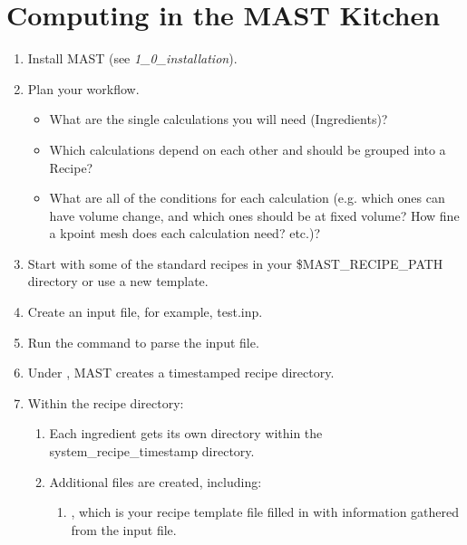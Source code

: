 \documentclass[letterpaper,10pt,english]{sphinxmanual}
\begin{document}
\section{Computing in the MAST Kitchen}
\label{0_0_introduction:computing-in-the-mast-kitchen}\begin{enumerate}
\item {} 
Install MAST (see \emph{1\_0\_installation}).

\item {} 
Plan your workflow.
\begin{itemize}
\item {} 
What are the single calculations you will need (Ingredients)?

\item {} 
Which calculations depend on each other and should be grouped into a Recipe?

\item {} 
What are all of the conditions for each calculation (e.g. which ones can have volume change, and which ones should be at fixed volume? How fine a kpoint mesh does each calculation need? etc.)?

\end{itemize}

\item {} 
Start with some of the standard recipes in your \$MAST\_RECIPE\_PATH directory or use a new template.

\item {} 
Create an input file, for example, test.inp.

\item {} 
Run the command  to parse the input file.

\item {} 
Under , MAST creates a timestamped recipe directory.

\item {} 
Within the recipe directory:
\begin{enumerate}
\item {} 
Each ingredient gets its own directory within the system\_recipe\_timestamp directory.

\item {} 
Additional files are created, including:
\begin{enumerate}
\item {} 
, which is your recipe template file filled in with information gathered from the input  file.


\end{enumerate}
\end{enumerate}
\end{enumerate}
\end{document}
